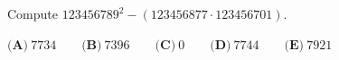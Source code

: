 Compute $123456789^2-(123456877\cdot123456701)$.

$\textbf{(A)}~7734\qquad\textbf{(B)}~7396\qquad\textbf{(C)}~0\qquad\textbf{(D)}~7744\qquad\textbf{(E)}~7921\qquad$
